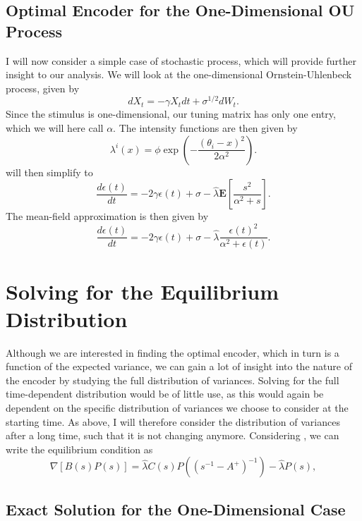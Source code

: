 \subsection{Optimal Encoder for the One-Dimensional OU Process}
I will now consider a simple case of stochastic process, which will provide further insight to our analysis. We will look at the one-dimensional Ornstein-Uhlenbeck process, given by
\[
dX_t = -\gamma X_t dt + \sigma^{1/2} dW_t.
\]
Since the stimulus is one-dimensional, our tuning matrix has only one entry, which we will here call $\alpha$. The intensity functions are then given by
\[
\lambda ^i(x) = \phi \exp\left(-\frac{(\theta_i-x)^2}{2\alpha^2}\right).
\]
 will then simplify to
\begin{equation}
\label{eq:epsilon_1d_exact}
\frac{d\epsilon(t)}{dt} = -2\gamma \epsilon(t) + \sigma -\hat{\lambda} \boldsymbol{E}\left[\frac{s^2}{\alpha^2+s}\right].
\end{equation}
The mean-field approximation is then given by
\begin{equation}
\label{eq:epsilon_1d_mf}
\frac{d\epsilon(t)}{dt} = -2\gamma \epsilon(t) + \sigma -\hat{\lambda} \frac{\epsilon(t)^2}{\alpha^2+\epsilon(t)}.
\end{equation}

\section{Solving for the Equilibrium Distribution}
Although we are interested in finding the optimal encoder, which in turn is a function of the expected variance, we can gain a lot of insight into the nature of the encoder by studying the full distribution of variances. Solving for the full time-dependent distribution would be of little use, as this would again be dependent on the specific distribution of variances we choose to consider at the starting time. As above, I will therefore consider the distribution of variances after a long time, such that it is not changing anymore. Considering , we can write the equilibrium condition as
\begin{equation}
\label{eq:equilibrium_DCKE_sigma}
\nabla \left[B(s) P(s)\right] = \hat{\lambda} C(s) P\left( (s^{-1} - A^+)^{-1}\right) -\hat{\lambda} P(s),
\end{equation}

\subsection{Exact Solution for the One-Dimensional Case}

